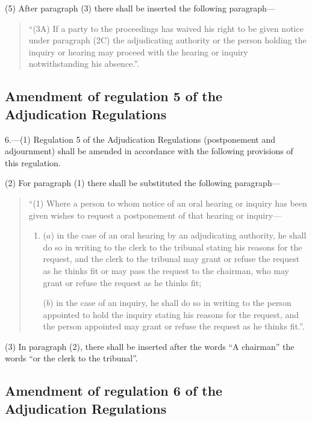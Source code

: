 \documentclass[a4paper]{article}
\begin{document}
(5) After paragraph (3) there shall be inserted the following paragraph—
\begin{quotation}
“(3A) If a party to the proceedings has waived his right to be given notice under paragraph (2C) the adjudicating authority or the person holding the inquiry or hearing may proceed with the hearing or inquiry notwithstanding his absence.”.
\end{quotation}

\subsection[6. Amendment of regulation 5 of the Adjudication Regulations]{Amendment of regulation 5 of the Adjudication Regulations}

6.—(1) Regulation 5 of the Adjudication Regulations (postponement and adjournment) shall be amended in accordance with the following provisions of this regulation.

(2) For paragraph (1) there shall be substituted the following paragraph—
\begin{quotation}
“(1) Where a person to whom notice of an oral hearing or inquiry has been given wishes to request a postponement of that hearing or inquiry—
\begin{enumerate}\item[]
($a$) in the case of an oral hearing by an adjudicating authority, he shall do so in writing to the clerk to the tribunal stating his reasons for the request, and the clerk to the tribunal may grant or refuse the request as he thinks fit or may pass the request to the chairman, who may grant or refuse the request as he thinks fit;

($b$) in the case of an inquiry, he shall do so in writing to the person appointed to hold the inquiry stating his reasons for the request, and the person appointed may grant or refuse the request as he thinks fit.”.
\end{enumerate}
\end{quotation}

(3) In paragraph (2), there shall be inserted after the words “A chairman” the words “or the clerk to the tribunal”.

\subsection[7. Amendment of regulation 6 of the Adjudication Regulations]{Amendment of regulation 6 of the Adjudication Regulations}
\end{document}
